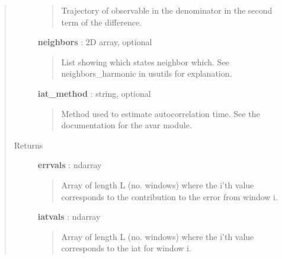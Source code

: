 \documentclass[letterpaper,10pt,english]{sphinxmanual}
\begin{document}
\begin{fulllineitems}
\begin{quote}
\begin{description}
\begin{quote}
Trajectory of observable in the denominator in the second term of the difference.
\end{quote}

\textbf{neighbors} : 2D array, optional
\begin{quote}

List showing which states neighbor which.  See neighbors\_harmonic in usutils for explanation.
\end{quote}

\textbf{iat\_method} : string, optional
\begin{quote}

Method used to estimate autocorrelation time.  See the documentation for the avar module.
\end{quote}

\item[{Returns}] \leavevmode
\textbf{errvals} : ndarray
\begin{quote}

Array of length L (no. windows) where the i'th value corresponds to the contribution to the error from window i.
\end{quote}

\textbf{iatvals} : ndarray
\begin{quote}

Array of length L (no. windows) where the i'th value corresponds to the iat for window i.
\end{quote}

\end{description}\end{quote}

\end{fulllineitems}

\end{document}
